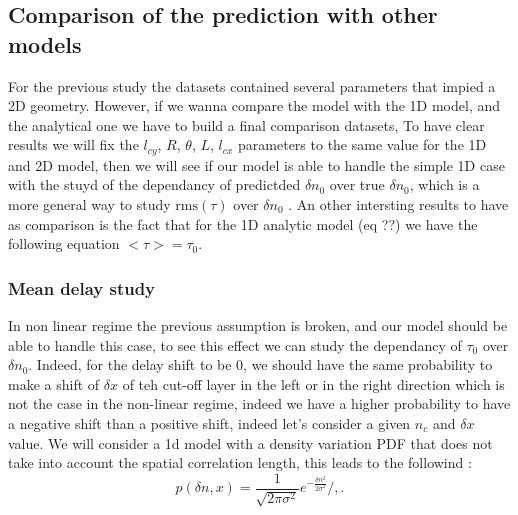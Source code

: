 \documentclass[11pt,a4paper,openany]{report}
\begin{document}
\begin{multicols}{2}

    \subsection{Comparison of the prediction with other models}
    For the previous study the datasets contained several parameters that impied a 2D geometry. However, if we wanna compare the model with the 1D model, and the analytical one we have to build a final comparison datasets, To have clear results we will fix the $l_{cy}$, $R$, $\theta$, $L$, $l_{cx}$ parameters to the same value for the 1D and 2D model, then we will see if our model is able to handle the simple 1D case with the stuyd of the dependancy of predictded $\delta n_0$ over true $\delta n_0$, which is a more general way to study $\text{rms}(\tau)$ over $\delta n_0$ . An other intersting results to have as comparison is the fact that for the 1D analytic model (eq ??) we have the following equation $< \tau > = \tau_0$.
    \subsubsection{Mean delay study}
    In non linear regime the previous assumption is broken, and our model should be able to handle this case, to see this effect we can study the dependancy of $\tau_0$ over $\delta n_0$. Indeed, for the delay shift to be 0, we should have the same probability to make a shift of $\delta x$ of teh cut-off layer in the left or in the right direction which is not the case in the non-linear regime, indeed we have a higher probability to have a negative shift than a positive shift, indeed let's consider a given $n_c$ and $\delta x$ value. We will consider a 1d model with a density variation PDF that does not take into account the spatial correlation length, this leads to the followind : $$p(\delta n, x) = \frac{1}{\sqrt{2 \pi \sigma^2}}e^{-\frac{\delta n^2}{2\sigma^2}} /,.$$


\end{multicols}
\end{document}
